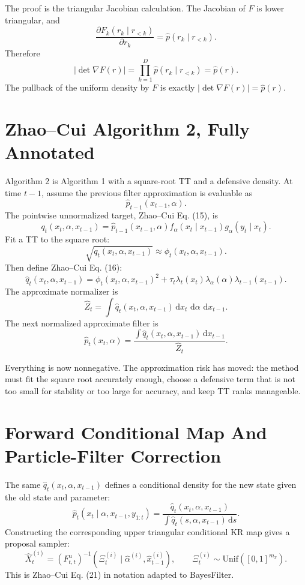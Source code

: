 \documentclass[11pt]{article}
\newcommand{\dd}{\,\mathrm d}
\begin{document}
The proof is the triangular Jacobian calculation.  The Jacobian of \(F\) is
lower triangular, and
\[
    \frac{\partial F_k(r_k\mid r_{<k})}{\partial r_k}
    =
    \widehat p(r_k\mid r_{<k}).
\]
Therefore
\[
    |\det\nabla F(r)|
    =
    \prod_{k=1}^D \widehat p(r_k\mid r_{<k})
    =
    \widehat p(r).
    \tag{K5}
\]
The pullback of the uniform density by \(F\) is exactly
\(|\det\nabla F(r)|=\widehat p(r)\).

\section{Zhao--Cui Algorithm 2, Fully Annotated}

Algorithm 2 is Algorithm 1 with a square-root TT and a defensive density.
At time \(t-1\), assume the previous filter approximation is evaluable as
\[
    \widehat p_{t-1}(x_{t-1},\alpha).
\]
The pointwise unnormalized target, Zhao--Cui Eq. (15), is
\[
    q_t(x_t,\alpha,x_{t-1})
    =
    \widehat p_{t-1}(x_{t-1},\alpha)
    f_\alpha(x_t\mid x_{t-1})
    g_\alpha(y_t\mid x_t).
    \tag{A2-1}
\]
Fit a TT to the square root:
\[
    \sqrt{q_t(x_t,\alpha,x_{t-1})}
    \approx
    \phi_t(x_t,\alpha,x_{t-1}).
    \tag{A2-2}
\]
Then define Zhao--Cui Eq. (16):
\[
    \widehat q_t(x_t,\alpha,x_{t-1})
    =
    \phi_t(x_t,\alpha,x_{t-1})^2
    +
    \tau_t\lambda_t(x_t)\lambda_\alpha(\alpha)\lambda_{t-1}(x_{t-1}).
    \tag{A2-3}
\]
The approximate normalizer is
\[
    \widehat Z_t
    =
    \int \widehat q_t(x_t,\alpha,x_{t-1})
    \dd x_t\,\dd\alpha\,\dd x_{t-1}.
    \tag{A2-4}
\]
The next normalized approximate filter is
\[
    \widehat p_t(x_t,\alpha)
    =
    \frac{\int \widehat q_t(x_t,\alpha,x_{t-1})\dd x_{t-1}}
    {\widehat Z_t}.
    \tag{A2-5}
\]

Everything is now nonnegative.  The approximation risk has moved: the method
must fit the square root accurately enough, choose a defensive term that is not
too small for stability or too large for accuracy, and keep TT ranks manageable.

\section{Forward Conditional Map And Particle-Filter Correction}

The same \(\widehat q_t(x_t,\alpha,x_{t-1})\) defines a conditional density for
the new state given the old state and parameter:
\[
    \widehat p_t(x_t\mid \alpha,x_{t-1},y_{1:t})
    =
    \frac{\widehat q_t(x_t,\alpha,x_{t-1})}
    {\int \widehat q_t(s,\alpha,x_{t-1})\dd s}.
    \tag{F1}
\]
Constructing the corresponding upper triangular conditional KR map gives a
proposal sampler:
\[
    \widehat X_t^{(i)}
    =
    (F_{t,t}^{u})^{-1}
    \left(\Xi_t^{(i)}\mid \widehat\alpha^{(i)},\widehat x_{t-1}^{(i)}\right),
    \qquad
    \Xi_t^{(i)}\sim\mathrm{Unif}([0,1]^{m_x}).
    \tag{F2}
\]
This is Zhao--Cui Eq. (21) in notation adapted to BayesFilter.
\end{document}
